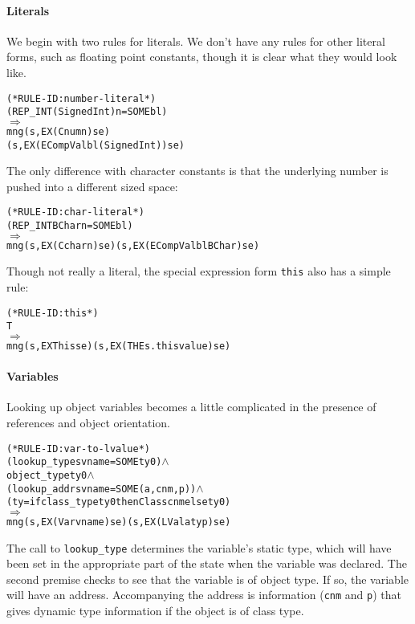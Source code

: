 \documentclass[11pt]{article}
\begin{document}
\paragraph{Literals} We begin with two rules for literals.  We don't
have any rules for other literal forms, such as floating point
constants, though it is clear what they would look like.
%
%
\begin{alltt}
(* RULE-ID: number-literal *)
     (REP_INT (Signed Int) n = SOME bl)
   \(\Rightarrow\)
     mng (s, EX (Cnum n) se)
         (s, EX (ECompVal bl (Signed Int)) se)
\end{alltt}

The only difference with character constants is that the underlying
number is pushed into a different sized space:
%
\begin{alltt}
(* RULE-ID: char-literal *)
     (REP_INT BChar n = SOME bl)
   \(\Rightarrow\)
     mng (s, EX (Cchar n) se) (s, EX (ECompVal bl BChar) se)
\end{alltt}

 Though not really a literal, the special
\cpp{} expression form \texttt{this} also has a simple rule:
\begin{center}
\begin{minipage}{\textwidth}
\begin{alltt}
(* RULE-ID: this *)
     T
   \(\Rightarrow\)
     mng (s, EX This se) (s, EX (THE s.thisvalue) se)
\end{alltt}
\end{minipage}
\end{center}


\paragraph{Variables} Looking up object variables becomes a little
complicated in the presence of references and object orientation.
%
%
\begin{alltt}
(* RULE-ID: var-to-lvalue *)
     (lookup_type s vname = SOME ty0) \(\land\)
     object_type ty0 \(\land\)
     (lookup_addr s vname = SOME (a,cnm,p)) \(\land\)
     (ty = if class_type ty0 then Class cnm else ty0)
   \(\Rightarrow\)
     mng (s, EX (Var vname) se) (s, EX (LVal a ty p) se)
\end{alltt}
%
The call to \texttt{lookup_type} determines the variable's static
type, which will have been set in the appropriate part of the state
when the variable was declared.  The second premise checks to see that
the variable is of object type.  If so, the variable will have an
address.  Accompanying the address is information (\texttt{cnm} and
\texttt{p}) that gives dynamic type information if the object is of
class type.
\end{document}
